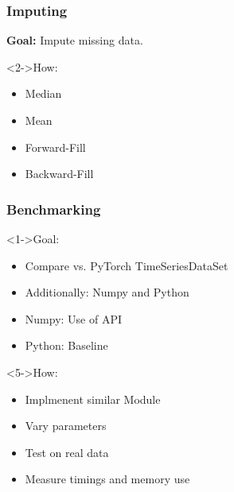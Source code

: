\documentclass[t,english]{beamer}
\begin{document}
\begin{frame}
    \frametitle{Imputing}
      \textbf{Goal:} Impute missing data.

    \begin{block}<2->{How:}
        \begin{itemize}
        \item<2-> Median
        \item <3-> Mean
        \item <4-> Forward-Fill
        \item <5-> Backward-Fill
        \end{itemize}
    \end{block}
\end{frame}


\begin{frame}
    \frametitle{Benchmarking}
    \begin{block}<1->{Goal:}
        \begin{itemize}
        \item<1-> Compare vs. PyTorch TimeSeriesDataSet
        \item<2-> Additionally: Numpy and Python
        \item <3-> Numpy: Use of API
        \item <4-> Python: Baseline
        \end{itemize}
    \end{block}

    \begin{block}<5->{How:}
        \begin{itemize}
        \item<5-> Implmenent similar Module
        \item<6-> Vary parameters
        \item <7-> Test on real data
        \item <8-> Measure timings and memory use
        \end{itemize}
    \end{block}
\end{frame}
\end{document}

